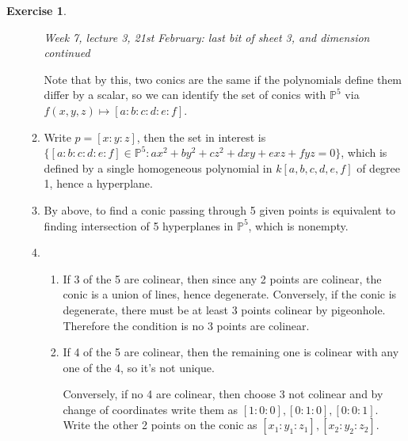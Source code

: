 \documentclass{article}
\newcommand{\p}{\mathbb{P}}
\theoremstyle{definition}
\newtheorem{exe}[defn]{Exercise}
\begin{document}
\begin{exe}
\begin{enumerate}
\begin{enumerate}
\begin{flushright}
\textit{Week 7, lecture 3, 21st February: last bit of sheet 3, and dimension continued}
\end{flushright}

Note that by this, two conics are the same if the polynomials define them differ by a scalar, so we can identify the set of conics with $\p^5$ via $f(x,y,z)\mapsto [a:b:c:d:e:f]$.
\item Write $p=[x:y:z]$, then the set in interest is $\{[a:b:c:d:e:f]\in\p^5:ax^2+by^2+cz^2+dxy+exz+fyz=0\}$, which is defined by a single homogeneous polynomial in $k[a,b,c,d,e,f]$ of degree 1, hence a hyperplane.
\item By above, to find a conic passing through 5 given points is equivalent to finding intersection of 5 hyperplanes in $\p^5$, which is nonempty.
\item \begin{enumerate}
\item If 3 of the 5 are colinear, then since any 2 points are colinear, the conic is a union of lines, hence degenerate. Conversely, if the conic is degenerate, there must be at least 3 points colinear by pigeonhole. Therefore the condition is no 3 points are colinear.
\item If 4 of the 5 are colinear, then the remaining one is colinear with any one of the 4, so it's not unique. \begin{minipage}{0.7\textwidth}
Conversely, if no 4 are colinear, then choose 3 not colinear and by change of coordinates write them as $[1:0:0],[0:1:0],[0:0:1]$. Write the other 2 points on the conic as $[x_1:y_1:z_1],[x_2:y_2:z_2]$.
\end{minipage}\begin{minipage}{0.05\textwidth}\phantom{1}\end{minipage}\begin{minipage}{0.25\textwidth}
\end{minipage} \\


\end{enumerate}
\end{enumerate}
\end{enumerate}
\end{exe}
\end{document}
